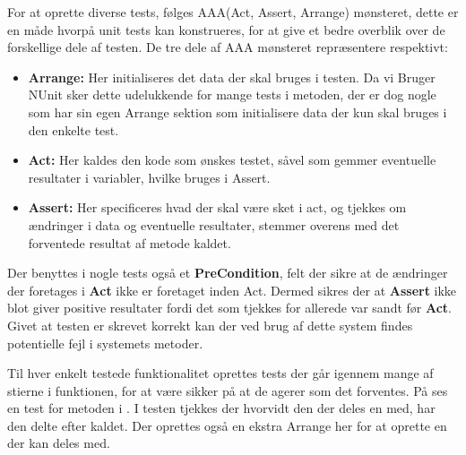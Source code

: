 For at oprette diverse tests, følges AAA(Act, Assert, Arrange) mønsteret, dette er en måde hvorpå unit tests kan konstrueres, for at give et bedre overblik over de forskellige dele af testen.
\citep{Writing_Your_Tests}
De tre dele af AAA mønsteret repræsentere respektivt:
\begin{itemize}
  \item \textbf{Arrange:} Her initialiseres det data der skal bruges i testen. Da vi Bruger NUnit sker dette udelukkende for mange tests i  metoden, der er dog nogle som har sin egen Arrange sektion som initialisere data der kun skal bruges i den enkelte test.
  \item \textbf{Act:} Her kaldes den kode som ønskes testet, såvel som gemmer eventuelle resultater i variabler, hvilke bruges i Assert.
  \item \textbf{Assert:} Her specificeres hvad der skal være sket i act, og tjekkes om ændringer i data og eventuelle resultater, stemmer overens med det forventede resultat af metode kaldet.
\end{itemize}
Der benyttes i nogle tests også et \textbf{PreCondition}, felt der sikre at de ændringer der foretages i \textbf{Act} ikke er foretaget inden Act. 
Dermed sikres der at \textbf{Assert} ikke blot giver positive resultater fordi det som tjekkes for allerede var sandt før \textbf{Act}.
Givet at testen er skrevet korrekt kan der ved brug af dette system findes potentielle fejl i systemets metoder.


Til hver enkelt testede funktionalitet oprettes tests der går igennem mange af stierne i funktionen, for at være sikker på at de  agerer som det forventes.
På  ses en test for metoden  i . I testen tjekkes der hvorvidt den  der deles en  med, har den delte  efter kaldet.
Der oprettes også en ekstra Arrange her for at oprette en  der kan deles med.

